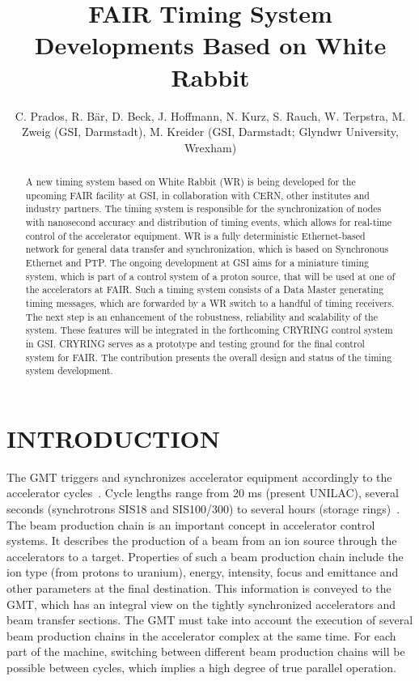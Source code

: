 \documentclass{JAC2003}
\begin{document}
\title{FAIR Timing System Developments Based on White Rabbit}

\author{C. Prados, R. B{\"a}r, D. Beck, J. Hoffmann, N. Kurz, S. Rauch, W. Terpstra, M. \\
Zweig (GSI, Darmstadt), M. Kreider (GSI, Darmstadt; Glyndwr University, \\
Wrexham)}
\maketitle


\begin{abstract}
 A new timing system based on White Rabbit (WR) is being developed for the
 upcoming FAIR facility at GSI, in collaboration with CERN, other institutes and
 industry partners. The timing system is responsible for the synchronization of
 nodes with nanosecond accuracy and distribution of timing events, which
 allows for real-time control of the accelerator equipment. WR is a fully
 deterministic Ethernet-based network for general data transfer and
 synchronization, which is based on Synchronous Ethernet and PTP. The ongoing
 development at GSI aims for a miniature timing system, which is part of a
 control system of a proton source, that will be used at one of the accelerators
 at FAIR. Such a timing system consists of a Data Master generating timing
 messages, which are forwarded by a WR switch to a handful of timing receivers.
 The next step is an enhancement of the robustness, reliability and scalability
 of the system. These features will be integrated in the forthcoming CRYRING
 control system in GSI. CRYRING serves as a prototype and testing ground for the
 final control system for FAIR. The contribution presents the overall design and
 status of the timing system development.
\end{abstract}


\section{INTRODUCTION}

The GMT triggers and synchronizes accelerator equipment accordingly 
to the accelerator cycles~\cite{fair_rep}. Cycle lengths range 
from 20 ms (present UNILAC), several seconds (synchrotrons SIS18 
and SIS100/300) to several hours (storage rings)~\cite{gmt}. The beam production chain is an important concept in
accelerator control systems. It describes the production of a beam
from an ion source through the accelerators to a target. Properties of such a beam production 
chain include the ion type (from protons to uranium), energy, intensity, focus
and emittance and other parameters at the final destination. This information is
conveyed to the GMT, which 
has an integral view on the tightly synchronized accelerators and beam transfer
sections. The GMT must take into account the execution of several beam production 
chains in the accelerator complex at the same time. For each part of the machine, switching 
between different beam production chains will be possible between cycles, which implies a 
high degree of true parallel operation.
\end{document}
